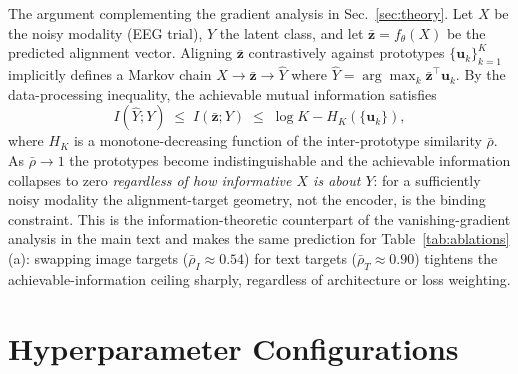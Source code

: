 \documentclass{article}
\begin{document}
The argument complementing the gradient analysis in Sec.~\ref{sec:theory}. Let $X$ be the noisy modality (EEG trial), $Y$ the latent class, and let $\bar{\mathbf{z}}=f_\theta(X)$ be the predicted alignment vector. Aligning $\bar{\mathbf{z}}$ contrastively against prototypes $\{\mathbf{u}_k\}_{k=1}^K$ implicitly defines a Markov chain $X\to\bar{\mathbf{z}}\to\hat Y$ where $\hat Y=\arg\max_k\bar{\mathbf{z}}^\top\mathbf{u}_k$. By the data-processing inequality, the achievable mutual information satisfies
\[
I(\hat Y;Y)\;\leq\;I(\bar{\mathbf{z}};Y)\;\leq\;\log K - H_K(\{\mathbf{u}_k\}),
\]
where $H_K$ is a monotone-decreasing function of the inter-prototype similarity $\bar{\rho}$. As $\bar{\rho}\to 1$ the prototypes become indistinguishable and the achievable information collapses to zero \emph{regardless of how informative $X$ is about $Y$}: for a sufficiently noisy modality the alignment-target geometry, not the encoder, is the binding constraint. This is the information-theoretic counterpart of the vanishing-gradient analysis in the main text and makes the same prediction for Table~\ref{tab:ablations}(a): swapping image targets ($\bar{\rho}_I{\approx}0.54$) for text targets ($\bar{\rho}_T{\approx}0.90$) tightens the achievable-information ceiling sharply, regardless of architecture or loss weighting.

\section{Hyperparameter Configurations}
\label{app:hyperparams}
\end{document}
